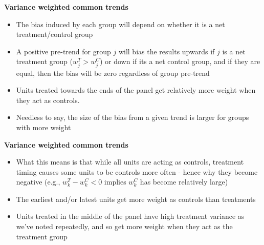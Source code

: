 \documentclass[notes=show]{beamer}
\begin{document}
\begin{frame}[plain]
\begin{center}
\textbf{Variance weighted common trends}
\end{center}

\begin{itemize}
\item The bias induced by each group will depend on whether it is a net treatment/control group
\item A positive pre-trend for group $j$ will bias the results upwards if $j$ is a net treatment group ($w_j^T>w_j^C$) or down if its a net control group, and if they are equal, then the bias will be zero regardless of group pre-trend
\item Units treated towards the ends of the panel get relatively more weight when they act as controls. 
\item Needless to say, the size of the bias from a given trend is larger for groups with more weight
\end{itemize}

\end{frame}

\begin{frame}[plain]
\begin{center}
\textbf{Variance weighted common trends}
\end{center}

\begin{itemize}
\item What this means is that while all units are acting as controls, treatment timing causes some units to be controls more often - hence why they become negative (e.g., $ w_k^T - w_k^C<0$ implies $w_k^C$ has become relatively large)
\item The earliest and/or latest units get more weight as controls than treatments
\item Units treated in the middle of the panel have high treatment variance as we've noted repeatedly, and so get more weight when they act as the treatment group
\end{itemize}

\end{frame}
\end{document}
